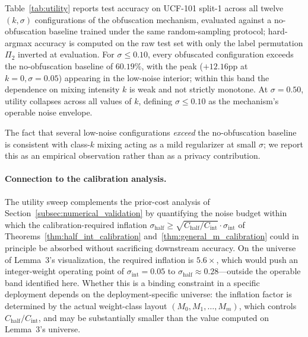 \documentclass[sigconf,anonymous, review]{acmart}
\begin{document}
Table~\ref{tab:utility} reports test accuracy on UCF-101 split-1 across all twelve $(k, \sigma)$ configurations of the obfuscation mechanism, evaluated against a no-obfuscation baseline trained under the same random-sampling protocol; hard-argmax accuracy is computed on the raw test set with only the label permutation $\Pi_2$ inverted at evaluation. For $\sigma \le 0.10$, every obfuscated configuration exceeds the no-obfuscation baseline of $60.19\%$, with the peak ($+12.16$pp at $k = 0, \sigma = 0.05$) appearing in the low-noise interior; within this band the dependence on mixing intensity $k$ is weak and not strictly monotone. At $\sigma = 0.50$, utility collapses across all values of $k$, defining $\sigma \le 0.10$ as the mechanism's operable noise envelope.

The fact that several low-noise configurations \emph{exceed} the no-obfuscation baseline is consistent with class-$k$ mixing acting as a mild regularizer at small $\sigma$; we report this as an empirical observation rather than as a privacy contribution.

\paragraph{Connection to the calibration analysis.}
The utility sweep complements the prior-cost analysis of Section~\ref{subsec:numerical_validation} by quantifying the noise budget within which the calibration-required inflation $\sigma_{\mathrm{half}} \ge \sqrt{C_{\mathrm{half}}/C_{\mathrm{int}}} \cdot \sigma_{\mathrm{int}}$ of Theorems~\ref{thm:half_int_calibration} and~\ref{thm:general_m_calibration} could in principle be absorbed without sacrificing downstream accuracy. On the universe of Lemma~3's visualization, the required inflation is $5.6\times$, which would push an integer-weight operating point of $\sigma_{\mathrm{int}} = 0.05$ to $\sigma_{\mathrm{half}} \approx 0.28$---outside the operable band identified here. Whether this is a binding constraint in a specific deployment depends on the deployment-specific universe: the inflation factor is determined by the actual weight-class layout $(M_0, M_1, \dots, M_m)$, which controls $C_{\mathrm{half}}/C_{\mathrm{int}}$, and may be substantially smaller than the value computed on Lemma~3's universe.
\end{document}
